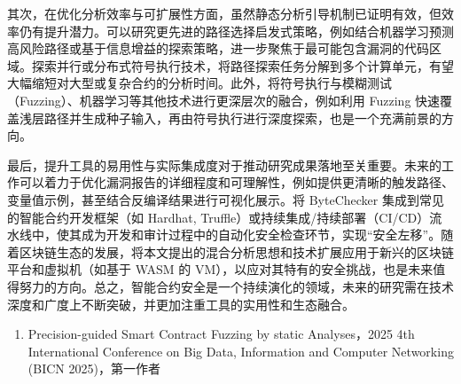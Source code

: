 \documentclass[print, master, vlined, timesmath]{DissertUESTC}
\begin{document}
其次，在优化分析效率与可扩展性方面，虽然静态分析引导机制已证明有效，但效率仍有提升潜力。可以研究更先进的路径选择启发式策略，例如结合机器学习预测高风险路径或基于信息增益的探索策略，进一步聚焦于最可能包含漏洞的代码区域。探索并行或分布式符号执行技术，将路径探索任务分解到多个计算单元，有望大幅缩短对大型或复杂合约的分析时间。此外，将符号执行与模糊测试（Fuzzing）、机器学习等其他技术进行更深层次的融合，例如利用 Fuzzing 快速覆盖浅层路径并生成种子输入，再由符号执行进行深度探索，也是一个充满前景的方向。

最后，提升工具的易用性与实际集成度对于推动研究成果落地至关重要。未来的工作可以着力于优化漏洞报告的详细程度和可理解性，例如提供更清晰的触发路径、变量值示例，甚至结合反编译结果进行可视化展示。将 ByteChecker 集成到常见的智能合约开发框架（如 Hardhat, Truffle）或持续集成/持续部署（CI/CD）流水线中，使其成为开发和审计过程中的自动化安全检查环节，实现“安全左移”。随着区块链生态的发展，将本文提出的混合分析思想和技术扩展应用于新兴的区块链平台和虚拟机（如基于 WASM 的 VM），以应对其特有的安全挑战，也是未来值得努力的方向。总之，智能合约安全是一个持续演化的领域，未来的研究需在技术深度和广度上不断突破，并更加注重工具的实用性和生态融合。




\achievement
\begin{enumerate}
    \item Precision-guided Smart Contract Fuzzing by static Analyses，2025 4th International Conference on Big Data, Information and Computer Networking (BICN 2025)，第一作者
\end{enumerate}
\end{document}
